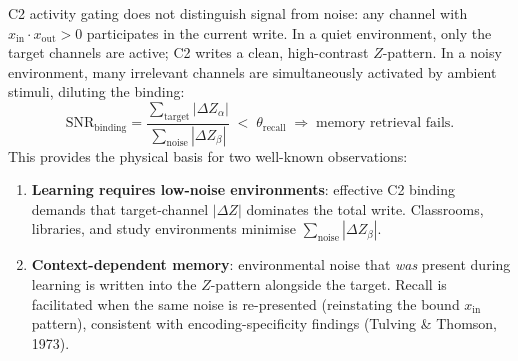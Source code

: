 \documentclass[aps,pre,twocolumn,superscriptaddress,floatfix]{revtex4-2}
\begin{document}
\begin{remark}
\label{rem:noise-binding}
C2 activity gating does not distinguish signal from
noise: any channel with $x_{\text{in}} \cdot
x_{\text{out}} > 0$ participates in the current write.
In a quiet environment, only the target channels are
active; C2 writes a clean, high-contrast $Z$-pattern.
In a noisy environment, many irrelevant channels are
simultaneously activated by ambient stimuli,
diluting the binding:
\[
  \text{SNR}_{\text{binding}}
  = \frac{\sum_{\text{target}} |\Delta Z_\alpha|}
         {\sum_{\text{noise}} |\Delta Z_\beta|}
  \;<\; \theta_{\text{recall}}
  \;\Rightarrow\;
  \text{memory retrieval fails.}
\]
This provides the physical basis for two well-known
observations:
\begin{enumerate}
  \item \textbf{Learning requires low-noise environments}:
    effective C2 binding demands that target-channel
    $|\Delta Z|$ dominates the total write.
    Classrooms, libraries, and study environments
    minimise $\sum_{\text{noise}} |\Delta Z_\beta|$.
  \item \textbf{Context-dependent memory}:
    environmental noise that \emph{was} present during
    learning is written into the $Z$-pattern alongside
    the target.
    Recall is facilitated when the same noise is
    re-presented (reinstating the bound $x_{\text{in}}$
    pattern), consistent with encoding-specificity
    findings (Tulving \& Thomson, 1973).
\end{enumerate}
\end{remark}
\end{document}
